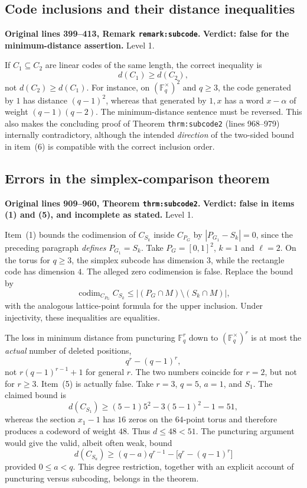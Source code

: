 \documentclass[12pt,letterpaper]{article}
\DeclareMathOperator{\codim}{codim}
\newcommand{\F}{\mathbb F}
\newcommand{\err}[1]{\textbf{#1}}
\newcommand{\level}[1]{\textsf{Level #1}}
\begin{document}
\subsection{Code inclusions and their distance inequalities}\label{sec:inclusions}
\textbf{Original lines 399--413, Remark \texttt{remark:subcode}.}\quad
\err{Verdict: false for the minimum-distance assertion.} \level{1}.

If $C_1\subseteq C_2$ are linear codes of the same length, the correct inequality is
\[
\boxed{d(C_1)\ge d(C_2),}
\]
not $d(C_2)\ge d(C_1)$.  For instance, on $(\F_q^\times)^2$ and $q\ge3$, the code generated by $1$ has distance $(q-1)^2$, whereas that generated by $1,x$ has a word $x-\alpha$ of weight $(q-1)(q-2)$.  The minimum-distance sentence must be reversed.  This also makes the concluding proof of Theorem \texttt{thrm:subcode2} (lines 968--979) internally contradictory, although the intended \emph{direction} of the two-sided bound in item~(6) is compatible with the correct inclusion order.

\subsection{Errors in the simplex-comparison theorem}\label{sec:simplex}
\textbf{Original lines 909--960, Theorem \texttt{thrm:subcode2}.}\quad
\err{Verdict: false in items (1) and (5), and incomplete as stated.} \level{1}.

Item~(1) bounds the codimension of $C_{S_k}$ inside $C_{P_G}$ by $|P_{G_1}-S_k|=0$, since the preceding paragraph \emph{defines} $P_{G_1}=S_k$.  Take $P_G=[0,1]^2$, $k=1$ and $\ell=2$.  On the torus for $q\ge3$, the simplex subcode has dimension $3$, while the rectangle code has dimension $4$.  The alleged zero codimension is false.  Replace the bound by
\[
\codim_{C_{P_G}}C_{S_k}
\le\bigl|(P_G\cap M)\setminus(S_k\cap M)\bigr|,
\]
with the analogous lattice-point formula for the upper inclusion.  Under injectivity, these inequalities are equalities.

The loss in minimum distance from puncturing $\F_q^r$ down to $(\F_q^\times)^r$ is at most the \emph{actual} number of deleted positions,
\[
q^r-(q-1)^r,
\]
not $r(q-1)^{r-1}+1$ for general $r$.  The two numbers coincide for $r=2$, but not for $r\ge3$.  Item~(5) is actually false.  Take $r=3$, $q=5$, $a=1$, and $S_1$.  The claimed bound is
\[
d(C_{S_1})\ge(5-1)5^2-3(5-1)^2-1=51,
\]
whereas the section $x_1-1$ has $16$ zeros on the $64$-point torus and therefore produces a codeword of weight $48$.  Thus $d\le48<51$.  The puncturing argument would give the valid, albeit often weak, bound
\[
d(C_{S_a})\ge(q-a)q^{r-1}-\bigl[q^r-(q-1)^r\bigr]
\]
provided $0\le a<q$.  This degree restriction, together with an explicit account of puncturing versus subcoding, belongs in the theorem.
\end{document}
